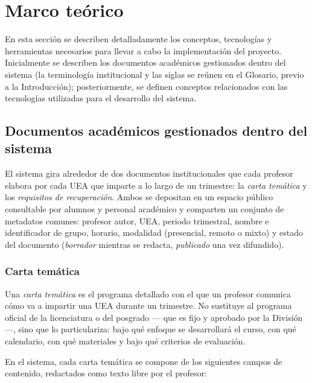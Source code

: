\section{Marco teórico}\label{sec:marco}
\justifying

En esta sección se describen detalladamente los conceptos, tecnologías y herramientas necesarios para llevar a cabo la implementación del proyecto. Inicialmente se describen los documentos académicos gestionados dentro del sistema (la terminología institucional y las siglas se reúnen en el Glosario, previo a la Introducción); posteriormente, se definen conceptos relacionados con las tecnologías utilizadas para el desarrollo del sistema.

\subsection{Documentos académicos gestionados dentro del sistema}\label{subsec:documentos}

El sistema gira alrededor de dos documentos institucionales que cada profesor elabora por cada UEA que imparte a lo largo de un trimestre: la \emph{carta temática} y los \emph{requisitos de recuperación}. Ambos se depositan en un espacio público consultable por alumnos y personal académico y comparten un conjunto de metadatos comunes: profesor autor, UEA, periodo trimestral, nombre e identificador de grupo, horario, modalidad (presencial, remoto o mixto) y estado del documento (\emph{borrador} mientras se redacta, \emph{publicado} una vez difundido).

\subsubsection*{Carta temática}

Una \emph{carta temática} es el programa detallado con el que un profesor comunica cómo va a impartir una UEA durante un trimestre. No sustituye al programa oficial de la licenciatura o del posgrado --- que es fijo y aprobado por la División ---, sino que lo particulariza: bajo qué enfoque se desarrollará el curso, con qué calendario, con qué materiales y bajo qué criterios de evaluación.

En el sistema, cada carta temática se compone de los siguientes campos de contenido, redactados como texto libre por el profesor:

